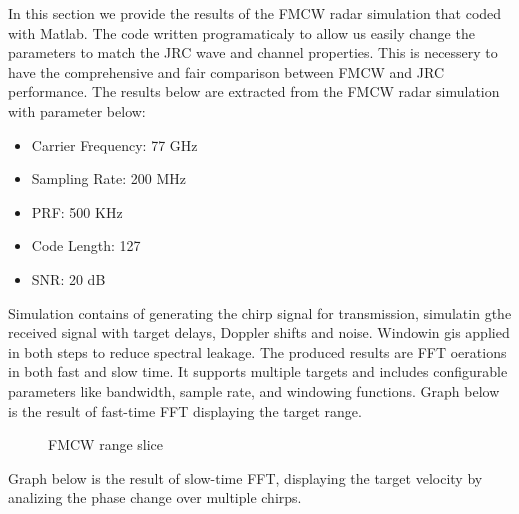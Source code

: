 \documentclass[conference]{IEEEtran}
\begin{document}
In this section we provide the results of the FMCW radar simulation that coded with Matlab. The code written programaticaly to allow us easily change the parameters to match the JRC wave and channel properties. This is necessery to have the comprehensive and fair comparison between FMCW and JRC performance. 
The results below are extracted from the FMCW  radar simulation with parameter below:
	\begin{itemize}
	\item Carrier Frequency:	77 GHz
	\item Sampling Rate:		200 MHz
	\item PRF:				500 KHz
	\item Code Length:		127
	\item SNR:				20 dB
	\end{itemize}
	
Simulation contains of generating the chirp signal for transmission, simulatin gthe received signal with target delays, Doppler shifts and noise. Windowin gis applied in both steps to reduce spectral leakage. The produced results are  FFT oerations in both fast and slow time. It supports multiple targets and includes configurable parameters like bandwidth, sample rate, and windowing functions. Graph below is the result of fast-time FFT displaying the target range.

	\begin{figure}[H]
	    		\centering
	    		\caption{FMCW range slice}
		\end{figure}

Graph below is the result of slow-time FFT, displaying the target velocity by analizing the phase change over multiple chirps. 
\end{document}
